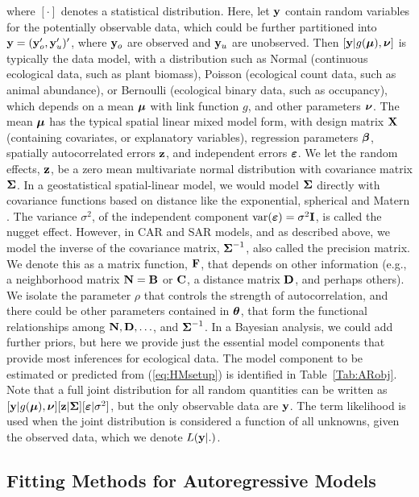 \documentclass[11pt, titlepage]{article}\usepackage[]{graphicx}\usepackage[]{color}
\begin{document}
where $[\cdot]$ denotes a statistical distribution.  Here, let $\mathbf{y}$ contain random variables for the potentially observable data, which could be further partitioned into $\mathbf{y} = (\mathbf{y}_o^{\prime}, \mathbf{y}_u^{\prime})^{\prime}$, where $\mathbf{y}_o$ are observed and $\mathbf{y}_u$ are unobserved.  Then $[\mathbf{y}|g(\mbox{\boldmath $\mu$}), \mbox{\boldmath $\nu$}]$ is typically the data model, with a distribution such as Normal (continuous ecological data, such as plant biomass), Poisson (ecological count data, such as animal abundance), or Bernoulli (ecological binary data, such as occupancy), which depends on a mean $\mbox{\boldmath $\mu$}$ with link function $g$, and other parameters $\mbox{\boldmath $\nu$}$.  The mean $\mbox{\boldmath $\mu$}$ has the typical spatial linear mixed model form, with design matrix $\mathbf{X}$ (containing covariates, or explanatory variables), regression parameters $\mbox{\boldmath $\beta$}$, spatially autocorrelated errors $\mathbf{z}$, and independent errors $\mbox{\boldmath $\varepsilon$}$.  We let the random effects, $\mathbf{z}$, be a zero mean multivariate normal distribution with covariance matrix $\mbox{\boldmath $\Sigma$}$.  In a geostatistical spatial-linear model, we would model $\mbox{\boldmath $\Sigma$}$ directly with covariance functions based on distance like the exponential, spherical and Matern \citep{Chil:Delf:geos:1999}. The variance $\sigma^2$, of the independent component $\textrm{var}(\mbox{\boldmath $\varepsilon$}) = \sigma^2\mathbf{I}$, is called the nugget effect.  However, in CAR and SAR models, and as described above, we model the inverse of the covariance matrix, $\mbox{\boldmath $\Sigma$}^{-1}$, also called the precision matrix.  We denote this as a matrix function, $\mathbf{F}$, that depends on other information (e.g., a neighborhood matrix $\mathbf{N} = \mathbf{B}$ or $\mathbf{C}$, a distance matrix $\mathbf{D}$, and perhaps others). We isolate the parameter $\rho$ that controls the strength of autocorrelation, and there could be other parameters contained in $\mbox{\boldmath $\theta$}$, that form the functional relationships among $\mathbf{N}, \mathbf{D}, \ldots$, and $\mbox{\boldmath $\Sigma$}^{-1}$. In a Bayesian analysis, we could add further priors, but here we provide just the essential model components that provide most inferences for ecological data.  The model component to be estimated or predicted from (\ref{eq:HMsetup}) is identified in Table~\ref{Tab:ARobj}.  Note that a full joint distribution for all random quantities can be written as $[\mathbf{y}|g(\mbox{\boldmath $\mu$}),\mbox{\boldmath $\nu$}][\mathbf{z}|\mbox{\boldmath $\Sigma$}][\mbox{\boldmath $\varepsilon$}|\sigma^2]$, but the only observable data are $\mathbf{y}$. The term likelihood is used when the joint distribution is considered a function of all unknowns, given the observed data, which we denote $L(\mathbf{y}|.)$.

\subsection*{Fitting Methods for Autoregressive Models}
\end{document}
